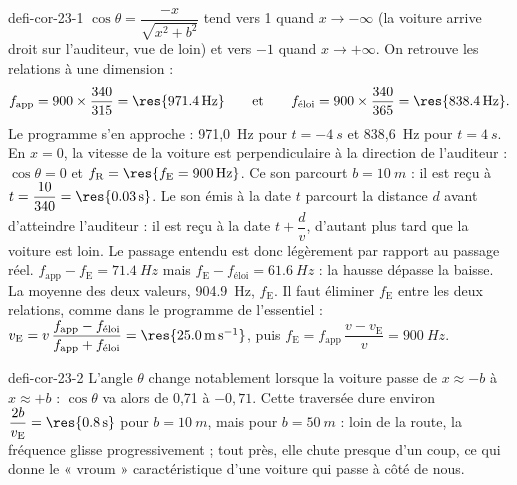 \begin{blocEdition}{defi-cor-23-1}
$\cos\theta=\dfrac{-x}{\sqrt{x^2+b^2}}$ tend vers 1 quand $x\to-\infty$ (la voiture arrive droit sur l'auditeur, vue de loin) et vers
$-1$ quand $x\to+\infty$. On retrouve les relations à une dimension :
\[f_\mathrm{app}=900\times\frac{340}{315}=\res{\qty{971,4}{Hz}}\qquad\text{et}\qquad f_\text{éloi}=900\times\frac{340}{365}=\res{\qty{838,4}{Hz}}.\]
Le programme s'en approche : 971,0~Hz pour $t=\qty{-4}{s}$ et 838,6~Hz pour $t=\qty{4}{s}$.
En $x=0$, la vitesse de la voiture est perpendiculaire à la direction de l'auditeur : $\cos\theta=0$ et
$f_\mathrm{R}=\res{f_\mathrm{E}=\qty{900}{Hz}}$. Ce son parcourt $b=\qty{10}{m}$ : il est reçu à $t=\dfrac{10}{340}=\res{\qty{0,03}{s}}$.
Le son émis à la date $t$ parcourt la distance $d$ avant d'atteindre l'auditeur : il est reçu à la date $t+\dfrac{d}{v}$,
d'autant plus tard que la voiture est loin. Le passage entendu est donc légèrement  par rapport au passage
réel.
$f_\mathrm{app}-f_\mathrm{E}=\qty{71,4}{Hz}$ mais $f_\mathrm{E}-f_\text{éloi}=\qty{61,6}{Hz}$ : la hausse dépasse la baisse. La moyenne des deux
valeurs, \qty{904,9}{Hz},  $f_\mathrm{E}$. Il faut éliminer $f_\mathrm{E}$ entre les deux relations, comme dans le
programme de l'essentiel : $v_\mathrm{E}=v\,\dfrac{f_\mathrm{app}-f_\text{éloi}}{f_\mathrm{app}+f_\text{éloi}}=\res{\qty{25,0}{m.s^{-1}}}$, puis
$f_\mathrm{E}=f_\mathrm{app}\,\dfrac{v-v_\mathrm{E}}{v}=\qty{900}{Hz}$.
\end{blocEdition}

\begin{blocEdition}{defi-cor-23-2}
\label{figedition-defi-cor-23-2-1}
L'angle $\theta$ change notablement lorsque la voiture passe de $x\approx-b$ à $x\approx+b$ : $\cos\theta$ va alors de 0,71 à $-0,71$.
Cette traversée dure environ $\dfrac{2b}{v_\mathrm{E}}=\res{\qty{0,8}{s}}$ pour $b=\qty{10}{m}$, mais  pour $b=\qty{50}{m}$ : loin de la
route, la fréquence glisse progressivement ; tout près, elle chute presque d'un coup, ce qui donne le « vroum »
caractéristique d'une voiture qui passe à côté de nous.
\end{blocEdition}

